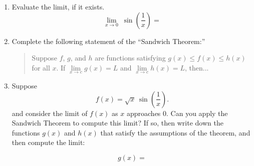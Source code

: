 \documentclass[fleqn,12pt]{article}
\newcommand{\<}{\ensuremath{\langle}}
\renewcommand{\>}{\ensuremath{\rangle}}
\begin{document}
\begin{enumerate}
\begin{enumerate}[{\it i.}]
        \bigskip
      \item  Evaluate the limit, if it exists.
        \label{item:5i}
        \[
        \lim_{x \rightarrow 0} \; \sin \left(\frac{1}{x}\right) =
        \]


        \bigskip

        \bigskip


      \item 
        \label{item:5ii} Complete the following statement of the ``Sandwich Theorem:''

        \bigskip

        \begin{quote}
          Suppose $f$, $g$, and $h$ are functions satisfying $g(x) \leq f(x) \leq h(x)$ for
          all $x$.  If $\lim\limits_{x\rightarrow c} g(x) = L$ and $\lim\limits_{x\rightarrow c} h(x) = L$, then...
        \end{quote}


        \vskip3cm


      \item 
        \label{item:5ii} 
        Suppose 
        \[
        f(x) = \sqrt{x} \,\sin \left(\frac{1}{x}\right).
        \]
        and consider the limit of $f(x)$ as $x$ approaches $0$.
        Can you apply the Sandwich Theorem to compute this limit? 
        If so, then write down the
        functions $g(x)$ and $h(x)$ that satisfy the assumptions of the 
        theorem, and then compute the limit: 

         {
        \[ g(x) = \]

}
\end{enumerate}
\end{enumerate}
\end{document}
